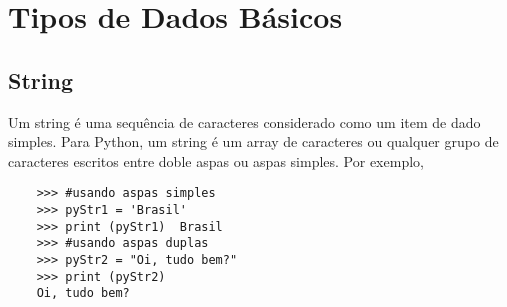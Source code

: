     \section{Tipos de Dados B\'{a}sicos}

            \subsection{String}
            Um string \'{e} uma sequ\^{e}ncia de caracteres considerado como um item de dado simples. Para Python, um string \'{e} um array de caracteres ou qualquer grupo de caracteres escritos entre doble aspas ou aspas simples. Por exemplo,
    \begin{lstlisting}
    >>> #usando aspas simples
    >>> pyStr1 = 'Brasil'
    >>> print (pyStr1)  Brasil
    >>> #usando aspas duplas
    >>> pyStr2 = "Oi, tudo bem?"
    >>> print (pyStr2)
    Oi, tudo bem?
    \end{lstlisting}


